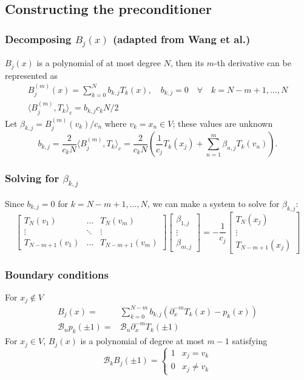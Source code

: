 \documentclass{beamer}
\begin{document}
\subsection{Constructing the preconditioner}

\begin{frame}
\frametitle{Decomposing $B_j(x)$ (adapted from Wang et al.)}
$B_j(x)$ is a polynomial of at most degree $N$, then its $m$-th derivative can be represented as
\begin{equation*}
\begin{gathered}
 B^{(m)}_j(x) = \sum_{k=0}^N b_{k,j} T_k(x), \quad b_{k,j} = 0 \quad \forall \quad k=N-m+1,...,N \\
\langle B^{(m)}_j,T_k \rangle_c = b_{k,j} c_k N / 2
\end{gathered}
\end{equation*}
Let $\beta_{k,j} = B^{(m)}_j(v_k)/c_n$ where $v_k = x_n \in V$; these values are unknown
\begin{equation*}
b_{k,j} = \frac{2}{c_k N} \langle B_j^{(m)}, T_k \rangle_c = \frac{2}{c_k N} \left ( \frac{1}{c_j} T_k(x_j) + \sum_{n=1}^m \beta_{n,j} T_k(v_n) \right ).
\end{equation*}
\end{frame}

\begin{frame}
\frametitle{Solving for $\beta_{k,j}$}
Since $b_{k,j} = 0$ for $k = N-m+1,...,N$, we can make a system to solve for $\beta_{k,j}$:
\begin{equation*}
\begin{bmatrix} T_N(v_1) & \dots & T_N(v_m) \\ \vdots & \ddots & \vdots \\ T_{N-m+1}(v_1) & \dots & T_{N-m+1}(v_m) \end{bmatrix}
\begin{bmatrix} \beta_{1,j} \\ \vdots \\ \beta_{m,j} \end{bmatrix} = 
- \frac{1}{c_j} \begin{bmatrix} T_N(x_j) \\ \vdots \\ T_{N-m+1}(x_j) \end{bmatrix}
\end{equation*}
\end{frame}

\begin{frame}
\frametitle{Boundary conditions}
For $x_j \notin V$
\begin{align*}
B_j(x) = & \sum_{k=0}^{N-m} b_{k,j} \left ( \partial_x^{-m} T_k(x) - p_{k}(x) \right ) \\
\mathcal{B}_n p_{k}(\pm 1) = & \mathcal{B}_n \partial_x^{-m} T_k(\pm 1)
\end{align*}
For $x_j \in V$, $B_j(x)$ is a polynomial of degree at most $m-1$ satisfying
\begin{equation*}
\mathcal{B}_k B_j(\pm1) = \begin{cases} 1 & x_j = v_k \\ 0 & x_j \neq v_k \end{cases}
\end{equation*}
\end{frame}
\end{document}
